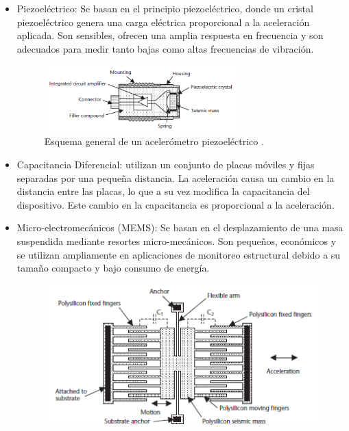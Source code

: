 \begin{itemize}
        \begin{itemize}
            \item Piezoeléctrico: Se basan en el principio piezoeléctrico, donde un cristal piezoeléctrico genera una carga eléctrica proporcional a la aceleración aplicada. Son sensibles, ofrecen una amplia respuesta en frecuencia y son adecuados para medir tanto bajas como altas frecuencias de vibración. 
            \begin{figure}[H]
                \centering
                \includegraphics[width = 0.7\textwidth]{imagenes/cap1_marcoteo/AccelerometerPiezo.png}
                \caption{Esquema general de un acelerómetro piezoeléctrico \citep{dunn2005introduction}.}
                \label{fig:acc-pie}
            \end{figure}
            \item Capacitancia Diferencial: utilizan un conjunto de placas móviles y fijas separadas por una pequeña distancia. La aceleración causa un cambio en la distancia entre las placas, lo que a su vez modifica la capacitancia del dispositivo. Este cambio en la capacitancia es proporcional a la aceleración.
            \item Micro-electromecánicos (MEMS): Se basan en el desplazamiento de una masa suspendida mediante resortes micro-mecánicos. Son pequeños, económicos y se utilizan ampliamente en aplicaciones de monitoreo estructural debido a su tamaño compacto y bajo consumo de energía.
            \begin{figure}[H]
                \centering
                \begin{minipage}{0.45\textwidth}
                    \centering
                    \includegraphics[width=1\textwidth]{imagenes/cap1_marcoteo/AccelerometerMEMS.png}

\end{minipage}
\end{figure}
\end{itemize}
\end{itemize}
